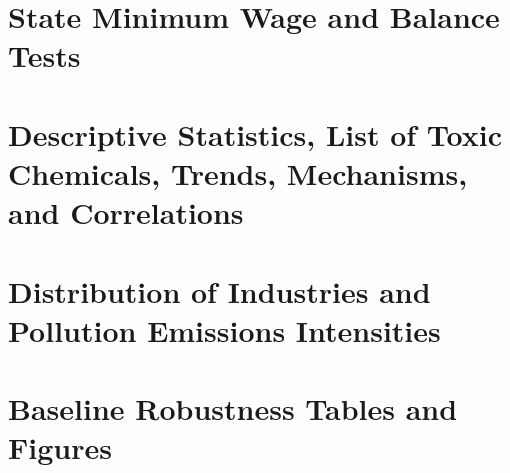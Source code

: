 \documentclass[12pt, english]{article}
\begin{document}
    \newpage
    \begin{appendices}
        \renewcommand\thesection{\Roman{section}} %
        \renewcommand\thesubsection{\Alph{subsection}} %


        \section{State Minimum Wage and Balance Tests}\label{sec:appendix-state-minimum-wage-and-balance-tests}
        
        
        
        
        


        \section{Descriptive Statistics, List of Toxic Chemicals, Trends, Mechanisms, and Correlations}\label{sec:appendix-descriptive-stat-list-of-toxic-chemicals-trends-mechanisms-and-correlations}
        
        
        
        
        
        
        


        \section{Distribution of Industries and Pollution Emissions Intensities}\label{sec:appendix-distribution-of-industries-and-pollution-emissions-intensities}
        
        
        
        
        
        
        
        
        
        
        
        
        


        \section{Baseline Robustness Tables and Figures}\label{sec:appendix-baseline-robustness-tables-and-figures}
        
        
        
        



\end{appendices}
\end{document}
